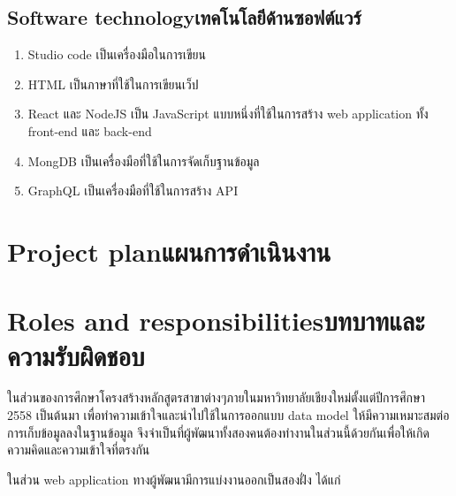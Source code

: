 \subsection{\ifenglish Software technology\else เทคโนโลยีด้านซอฟต์แวร์\fi}

\begin{enumerate}
    \item {} Studio code เป็นเครื่องมือในการเขียน
    \item HTML เป็นภาษาที่ใช้ในการเขียนเว็ป
    \item React และ NodeJS เป็น JavaScript แบบหนึ่งที่ใช้ในการสร้าง web application ทั้ง front-end และ back-end  
    \item MongDB เป็นเครื่องมือที่ใช้ในการจัดเก็บฐานข้อมูล
    \item GraphQL เป็นเครื่องมือที่ใช้ในการสร้าง API 
\end{enumerate}

\section{\ifenglish Project plan\else แผนการดำเนินงาน\fi}


\section{\ifenglish Roles and responsibilities\else บทบาทและความรับผิดชอบ\fi}

ในส่วนของการศึกษาโครงสร้างหลักสูตรสาขาต่างๆภายในมหาวิทยาลัยเชียงใหม่ตั้งแต่ปีการศึกษา 2558 เป็นต้นมา เพื่อทำความเข้าใจและนําไปใช้ในการออกแบบ data model ให้มีความเหมาะสมต่อการเก็บข้อมูลลงในฐานข้อมูล จึงจำเป็นที่ผู้พัฒนาทั้งสองคนต้องทำงานในส่วนนี้ด้วยกันเพื่อให้เกิดความคิดและความเข้าใจที่ตรงกัน 
	
ในส่วน web application ทางผู้พัฒนามีการแบ่งงานออกเป็นสองฝั่ง ได้แก่ 

